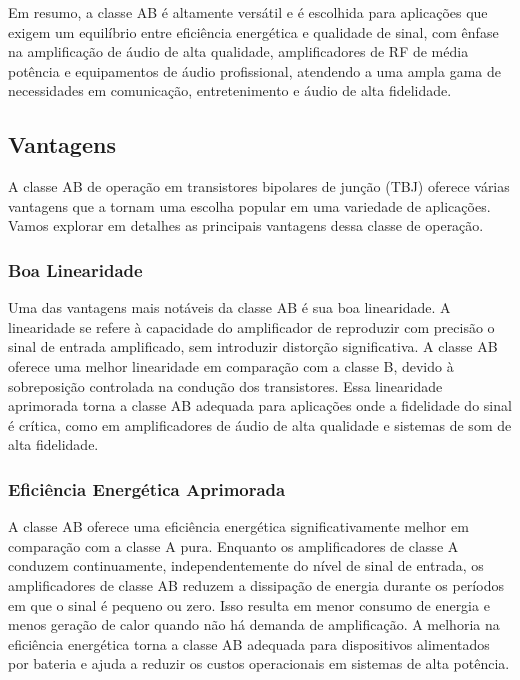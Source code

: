 Em resumo, a classe AB é altamente versátil e é escolhida para aplicações que exigem um equilíbrio entre eficiência energética e qualidade de sinal, com ênfase na amplificação de áudio de alta qualidade, amplificadores de RF de média potência e equipamentos de áudio profissional, atendendo a uma ampla gama de necessidades em comunicação, entretenimento e áudio de alta fidelidade.

\subsection{Vantagens}

A classe AB de operação em transistores bipolares de junção (TBJ) oferece várias vantagens que a tornam uma escolha popular em uma variedade de aplicações. Vamos explorar em detalhes as principais vantagens dessa classe de operação.

\subsubsection{Boa Linearidade}

Uma das vantagens mais notáveis da classe AB é sua boa linearidade. A linearidade se refere à capacidade do amplificador de reproduzir com precisão o sinal de entrada amplificado, sem introduzir distorção significativa. A classe AB oferece uma melhor linearidade em comparação com a classe B, devido à sobreposição controlada na condução dos transistores. Essa linearidade aprimorada torna a classe AB adequada para aplicações onde a fidelidade do sinal é crítica, como em amplificadores de áudio de alta qualidade e sistemas de som de alta fidelidade.

\subsubsection{Eficiência Energética Aprimorada}

A classe AB oferece uma eficiência energética significativamente melhor em comparação com a classe A pura. Enquanto os amplificadores de classe A conduzem continuamente, independentemente do nível de sinal de entrada, os amplificadores de classe AB reduzem a dissipação de energia durante os períodos em que o sinal é pequeno ou zero. Isso resulta em menor consumo de energia e menos geração de calor quando não há demanda de amplificação. A melhoria na eficiência energética torna a classe AB adequada para dispositivos alimentados por bateria e ajuda a reduzir os custos operacionais em sistemas de alta potência.


